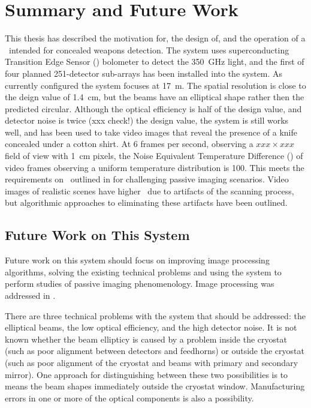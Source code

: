 \chapter{Summary and Future Work} \label{c:summary}

This thesis has described the motivation for, the design of, and the operation of a \Imager\ intended for concealed weapons detection.
The system uses superconducting Transition Edge Sensor (\TES) bolometer to detect the \SI{350}{\GHz} light, and the first of four planned 251-detector sub-arrays has been installed into the system.
As currently configured the system focuses at \SI{17}{\m}.
The spatial resolution is close to the deign value of \SI{1.4}{\cm}, but the beams have an elliptical shape rather then the predicted circular.
Although the optical efficiency is half of the design value, and detector noise is twice (xxx check!) the design value, the system is still works well, and has been used to take video images that reveal the presence of a knife concealed under a cotton shirt.
At 6 frames per second, observing a $xxx \times xxx$ field of view with \SI{1}{\cm} pixels, the Noise Equivalent Temperature Difference (\NETD) of video frames observing a uniform temperature distribution is \SI{100}{\mK}.
This meets the requirements on \NETD\ outlined in  for challenging passive imaging scenarios.
Video images of realistic scenes have higher \NETD\ due to artifacts of the scanning process, but algorithmic approaches to eliminating these artifacts have been outlined.

\section{Future Work on This System}

Future work on this system should focus on improving image processing algorithms, solving the existing technical problems and using the system to perform studies of passive imaging phenomenology.
Image processing was addressed in .

There are three technical problems with the system that should be addressed: the elliptical beams, the low optical efficiency, and the high detector noise.
It is not known whether the beam ellipticy is caused by a problem inside the cryostat (such as poor alignment between detectors and feedhorns) or outside the cryostat (such as poor alignment of the cryostat and beams with primary and secondary mirror).
One approach for distinguishing between these two possibilities is to means the beam shapes immediately outside the cryostat window.
Manufacturing errors in one or more of the optical components is also a possibility.

